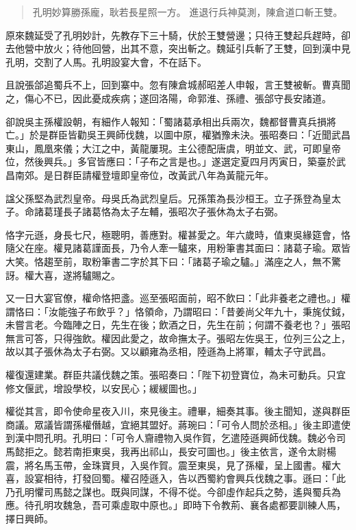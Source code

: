 \begin{quote}
孔明妙算勝孫龐，耿若長星照一方。
進退行兵神莫測，陳倉道口斬王雙。
\end{quote}

原來魏延受了孔明妙計，先教存下三十騎，伏於王雙營邊；只待王雙起兵趕時，卻去他營中放火；待他回營，出其不意，突出斬之。魏延引兵斬了王雙，回到漢中見孔明，交割了人馬。孔明設宴大會，不在話下。

且說張郃追蜀兵不上，回到寨中。忽有陳倉城郝昭差人申報，言王雙被斬。曹真聞之，傷心不已，因此憂成疾病；遂回洛陽，命郭淮、孫禮、張郃守長安諸道。

卻說吳主孫權設朝，有細作人報知：「蜀諸葛承相出兵兩次，魏都督曹真兵損將亡。」於是群臣皆勸吳王興師伐魏，以圖中原，權猶豫未決。張昭奏曰：「近聞武昌東山，鳳凰來儀；大江之中，黃龍屢現。主公德配唐虞，明並文、武，可即皇帝位，然後興兵。」多官皆應曰：「子布之言是也。」遂選定夏四月丙寅日，築臺於武昌南郊。是日群臣請權登壇即皇帝位，改黃武八年為黃龍元年。

諡父孫堅為武烈皇帝。母吳氏為武烈皇后。兄孫策為長沙桓王。立子孫登為皇太子。命諸葛瑾長子諸葛恪為太子左輔，張昭次子張休為太子右弼。

恪字元遜，身長七尺，極聰明，善應對。權甚愛之。年六歲時，值東吳緣筵會，恪隨父在座。權見諸葛謹面長，乃令人牽一驢來，用粉筆書其面曰：諸葛子瑜。眾皆大笑。恪趨至前，取粉筆書二字於其下曰：「諸葛子瑜之驢。」滿座之人，無不驚訝。權大喜，遂將驢賜之。

又一日大宴官僚，權命恪把盞。巡至張昭面前，昭不飲曰：「此非養老之禮也。」權謂恪曰：「汝能強子布飲乎？」恪領命，乃謂昭曰：「昔姜尚父年九十，秉旄仗鉞，未嘗言老。今臨陣之日，先生在後；飲酒之日，先生在前；何謂不養老也？」張昭無言可答，只得強飲。權因此愛之，故命撫太子。張昭左佐吳王，位列三公之上，故以其子張休為太子右弼。又以顧雍為丞相，陸遜為上將軍，輔太子守武昌。

權復還建業。群臣共議伐魏之策。張昭奏曰：「陛下初登寶位，為未可動兵。只宜修文偃武，增設學校，以安民心；緩緩圖也。」

權從其言，即令使命星夜入川，來見後主。禮畢，細奏其事。後主聞知，遂與群臣商議。眾議皆謂孫權僭越，宜絕其盟好。蔣琬曰：「可令人問於丞相。」後主即遣使到漢中問孔明。孔明曰：「可令人齎禮物入吳作賀，乞遣陸遜興師伐魏。魏必令司馬懿拒之。懿若南拒東吳，我再出祁山，長安可圖也。」後主依言，遂令太尉楊震，將名馬玉帶，金珠寶貝，入吳作賀。震至東吳，見了孫權，呈上國書。權大喜，設宴相待，打發回蜀。權召陸遜入，告以西蜀約會興兵伐魏之事。遜曰：「此乃孔明懼司馬懿之謀也。既與同謀，不得不從。今卻虛作起兵之勢，遙與蜀兵為應。待孔明攻魏急，吾可乘虛取中原也。」即時下令教荊、襄各處都要訓練人馬，擇日興師。

